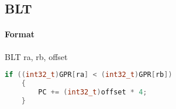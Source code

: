 \subsection{BLT}


\paragraph{Format} BLT ra, rb, offset

\begin{lstlisting}[language=c]
    if ((int32_t)GPR[ra] < (int32_t)GPR[rb])
    {
        PC += (int32_t)offset * 4;
    }
\end{lstlisting}

